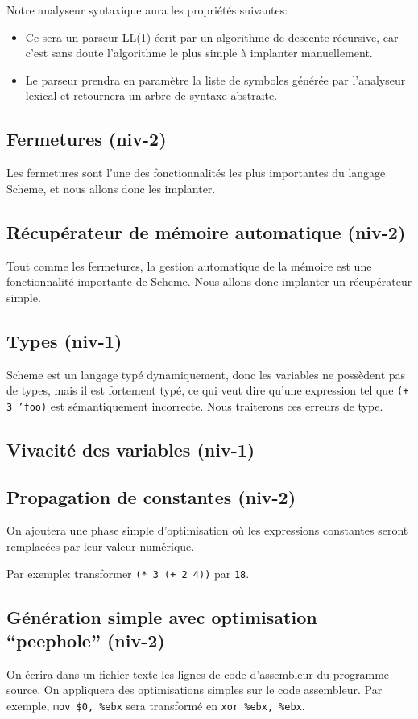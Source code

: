 \documentclass[11pt]{article}
\begin{document}
Notre analyseur syntaxique aura les propriétés suivantes:

\begin{itemize}
\item Ce sera un parseur LL(1) écrit par un algorithme de descente
  récursive, car c'est sans doute l'algorithme le plus simple à
  implanter manuellement.
\item Le parseur prendra en paramètre la liste de symboles générée par
  l'analyseur lexical et retournera un arbre de syntaxe abstraite.
\end{itemize}



\subsection{Fermetures (niv-2)}

Les fermetures sont l'une des fonctionnalités les plus importantes du
langage Scheme, et nous allons donc les implanter.

\subsection{Récupérateur de mémoire automatique (niv-2)}

Tout comme les fermetures, la gestion automatique de la mémoire est
une fonctionnalité importante de Scheme.  Nous allons donc implanter
un récupérateur simple.

\subsection{Types (niv-1)}

Scheme est un langage typé dynamiquement, donc les variables ne
possèdent pas de types, mais il est fortement typé, ce qui veut dire
qu'une expression tel que \texttt{(+ 3 'foo)} est sémantiquement
incorrecte.  Nous traiterons ces erreurs de type.

\subsection{Vivacité des variables (niv-1)}

\subsection{Propagation de constantes (niv-2)}

On ajoutera une phase simple d'optimisation où les expressions
constantes seront remplacées par leur valeur numérique.

Par exemple: transformer \texttt{(* 3 (+ 2 4))} par \texttt{18}.


\subsection{Génération simple avec optimisation ``peephole'' (niv-2)}

On écrira dans un fichier texte les lignes de code d'assembleur du
programme source.  On appliquera des optimisations simples sur le code
assembleur.  Par exemple, \texttt{mov \$0, \%ebx} sera transformé en
\texttt{xor \%ebx, \%ebx}.
\end{document}
